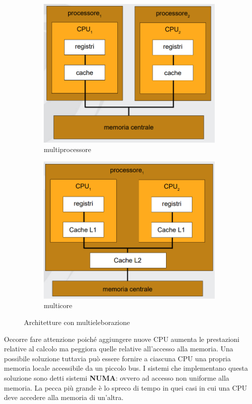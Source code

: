 \begin{figure}[h!]
  \begin{subfigure}{.5\textwidth}
  \centering
    \includegraphics[width=0.7\linewidth]{assets/multiprocessore1.png}
    \caption{multiprocessore}
  \end{subfigure}%
  \begin{subfigure}{.5\textwidth}
  \centering
    \includegraphics[width=0.7\linewidth]{assets/multicore1.png}
    \caption{multicore}
  \end{subfigure}
  \caption{Architetture con multieleborazione}
\end{figure}

Occorre fare attenzione poiché aggiungere nuove CPU aumenta le prestazioni relative al calcolo ma peggiora quelle relative all'accesso alla memoria. Una possibile soluzione tuttavia può essere fornire a ciascuna CPU una propria memoria locale accessibile da un piccolo bus. I sistemi che implementano questa soluzione sono detti sistemi \textbf{NUMA}: ovvero ad accesso non uniforme alla memoria. La pecca più grande è lo spreco di tempo in quei casi in cui una CPU deve accedere alla memoria di un'altra.

